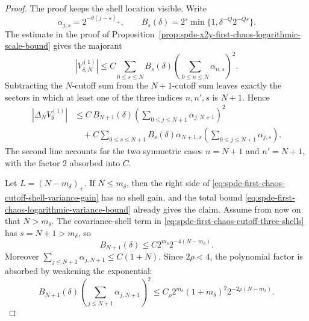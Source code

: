 \begin{proof}
The proof keeps the shell location visible.  Write
\[
  \alpha_{j,s}=2^{-\theta(j-s)_+},\qquad
  B_s(\delta)=2^s\min\{1,\delta^{-Q}2^{-Qs}\}.
\]
The estimate in the proof of
Proposition~\ref{prop:spde-x2y-first-chaos-logarithmic-scale-bound} gives
the majorant
\[
  |V_{\delta,N}^{(1)}|
  \leq
  C\sum_{0\leq s\leq N}
  B_s(\delta)
  \left(\sum_{0\leq n\leq N}\alpha_{n,s}\right)^2 .
\]
Subtracting the \(N\)-cutoff sum from the \(N+1\)-cutoff sum leaves exactly
the sectors in which at least one of the three indices \(n,n',s\) is
\(N+1\).  Hence
\begin{equation}
\begin{aligned}
  |\Delta_NV_\delta^{(1)}|
  &\leq
  C\,B_{N+1}(\delta)
  \left(\sum_{0\leq j\leq N+1}\alpha_{j,N+1}\right)^2        \\
  &\quad+
  C\sum_{0\leq s\leq N+1}
  B_s(\delta)\alpha_{N+1,s}
  \left(\sum_{0\leq j\leq N+1}\alpha_{j,s}\right).
\end{aligned}
  \label{eq:spde-first-chaos-cutoff-three-shells}
\end{equation}
The second line accounts for the two symmetric cases \(n=N+1\) and
\(n'=N+1\), with the factor \(2\) absorbed into \(C\).

Let \(L=(N-m_\delta)_+\).  If \(N\leq m_\delta\), then the right side of
\eqref{eq:spde-first-chaos-cutoff-shell-variance-gain} has no shell gain, and
the total bound
\eqref{eq:spde-first-chaos-logarithmic-variance-bound} already gives the
claim.  Assume from now on that \(N>m_\delta\).  The covariance-shell term in
\eqref{eq:spde-first-chaos-cutoff-three-shells} has \(s=N+1>m_\delta\), so
\[
  B_{N+1}(\delta)
  \leq
  C2^{m_\delta}2^{-4(N-m_\delta)} .
\]
Moreover
\(\sum_{j\leq N+1}\alpha_{j,N+1}\leq C(1+N)\).  Since
\(2\rho<4\), the polynomial factor is absorbed by weakening the exponential:
\[
  B_{N+1}(\delta)
  \left(\sum_{j\leq N+1}\alpha_{j,N+1}\right)^2
  \leq
  C_\rho 2^{m_\delta}(1+m_\delta)^2
  2^{-2\rho(N-m_\delta)} .
\]


\end{proof}
